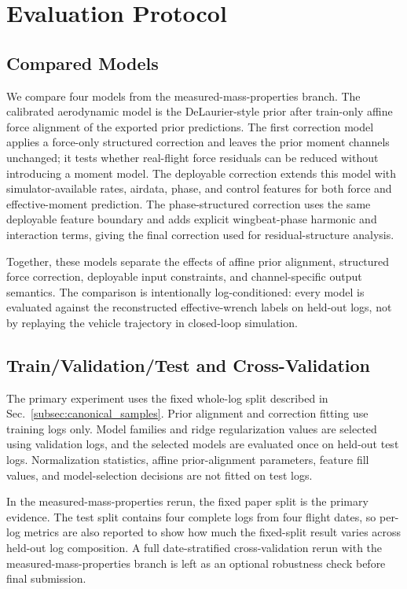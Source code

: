 \section{Evaluation Protocol}
\label{sec:evaluation}

\subsection{Compared Models}
\label{subsec:compared_models}

We compare four models from the measured-mass-properties branch. The calibrated aerodynamic model is the DeLaurier-style prior after train-only affine force alignment of the exported prior predictions. The first correction model applies a force-only structured correction and leaves the prior moment channels unchanged; it tests whether real-flight force residuals can be reduced without introducing a moment model. The deployable correction extends this model with simulator-available rates, airdata, phase, and control features for both force and effective-moment prediction. The phase-structured correction uses the same deployable feature boundary and adds explicit wingbeat-phase harmonic and interaction terms, giving the final correction used for residual-structure analysis.

Together, these models separate the effects of affine prior alignment, structured force correction, deployable input constraints, and channel-specific output semantics. The comparison is intentionally log-conditioned: every model is evaluated against the reconstructed effective-wrench labels on held-out logs, not by replaying the vehicle trajectory in closed-loop simulation.

\subsection{Train/Validation/Test and Cross-Validation}
\label{subsec:split_protocol}

The primary experiment uses the fixed whole-log split described in Sec.~\ref{subsec:canonical_samples}. Prior alignment and correction fitting use training logs only. Model families and ridge regularization values are selected using validation logs, and the selected models are evaluated once on held-out test logs. Normalization statistics, affine prior-alignment parameters, feature fill values, and model-selection decisions are not fitted on test logs.

In the measured-mass-properties rerun, the fixed paper split is the primary evidence. The test split contains four complete logs from four flight dates, so per-log metrics are also reported to show how much the fixed-split result varies across held-out log composition. A full date-stratified cross-validation rerun with the measured-mass-properties branch is left as an optional robustness check before final submission.

